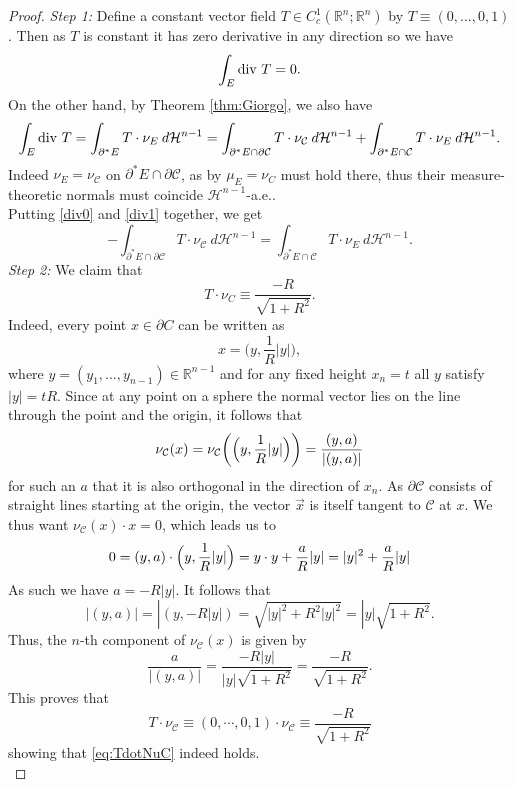 \documentclass[artcle, 11pt, reqno]{amsart}
\numberwithin{equation}{section}
\newcommand{\R}{\mathbb{R}}
\newcommand{\Hd}{\mathcal{H}}
\newcommand{\C}{\mathcal{C}}
\newcommand{\contvf}{C^1_c(\R^n; \R^n)}
\newcommand{\dd}{\: d}
\theoremstyle{plain}
\theoremstyle{definition}
\theoremstyle{remark}
\begin{document}
	
	\begin{proof} 
		\textit{Step 1:} Define a constant vector field $T \in \contvf$ by 
		$T \equiv (0,...,0,1)$. Then as $T$ is constant it has zero derivative in any direction so we have
		\begin{equation}
			\label{div0}
			\int_E \textnormal{div }T = 0.
		\end{equation}
		On the other hand, by Theorem \ref{thm:Giorgo}, we also have
		\begin{equation}\label{div1}
			\int_E \textnormal{div }T 
			= \int_{\partial^\ast E} T\cdot \nu_E \dd\Hd^{n-1} 
			= \int_{\partial^\ast E \cap \partial \C} T\cdot \nu_\C \dd\Hd^{n-1} + \int_{\partial^\ast E \cap \C} T\cdot \nu_E \dd\Hd^{n-1}.
		\end{equation}
		Indeed $\nu_E = \nu_\C$ on $\partial^\ast E \cap \partial \C$, as by \cite[Remark 12.4]{maggi2012sets} $\mu_E = \nu_C$ must hold there, thus their measure-theoretic normals must coincide $\Hd^{n-1}$-a.e..\\
		Putting \eqref{div0} and \eqref{div1} together, we get
		\begin{equation} \label{eq:DIV0}
			-\int_{\partial^\ast E \cap \partial \C} T\cdot \nu_\C \dd\Hd^{n-1} = \int_{\partial^\ast E \cap \C} T\cdot \nu_E \dd\Hd^{n-1}.
		\end{equation}
		\textit{Step 2:} We claim that 
		\begin{equation} \label{eq:TdotNuC}
			T \cdot \nu_C \equiv \frac{-R}{\sqrt{1+R^2}}.
		\end{equation}
		Indeed, every point $x \in \partial C$ can be written as 
		\[
		x = \bigl(y, \frac{1}{R}|y| \bigr),
		\]
		where $y = (y_1, ..., y_{n-1}) \in \R^{n-1}$ and for any fixed height $x_n = t$ all $y$ satisfy $|y|=tR$. Since at any point on a sphere the normal vector lies on the line through the point and the origin, it follows that 
		\[
		\nu_\C(x)=\nu_\C \biggl( \Bigl(   y, \frac{1}{R}|y| \Bigr)  \biggr) =\frac{(y,a)}{|(y,a)|}
		\]
		for such an $a$ that it is also orthogonal in the direction of $x_n$. As $\partial \C$ consists of straight lines starting at the origin, the vector $\vec{x}$ is itself tangent to $\C$ at $x$. We thus want $\nu_\C(x) \cdot x = 0$, which leads us to 
		\[
		0 = (y,a)\cdot \Bigl(   y, \frac{1}{R}|y| \Bigr) 
		= y \cdot y + \frac{a}{R}|y|
		= |y|^2 + \frac{a}{R}|y|
		\]
		As such we have $a = -R|y|$. It follows that
		\[
		|(y,a)|=|(y,-R|y|)=\sqrt{|y|^2 + R^2|y|^2}=|y|\sqrt{1+R^2}.
		\]
		Thus, the $n$-th component of $\nu_\C(x)$ is given by
		\[
		\frac{a}{|(y,a)|}=\frac{-R|y|}{|y|\sqrt{1+R^2}} = \frac{-R}{\sqrt{1+R^2}}.
		\]
		This proves that 
		\[
		T \cdot \nu_\C \equiv (0, \cdots, 0, 1) \cdot \nu_\C \equiv \frac{-R}{\sqrt{1+R^2}} 
		\]
		showing that \eqref{eq:TdotNuC} indeed holds. \\
		

\end{proof}
\end{document}
